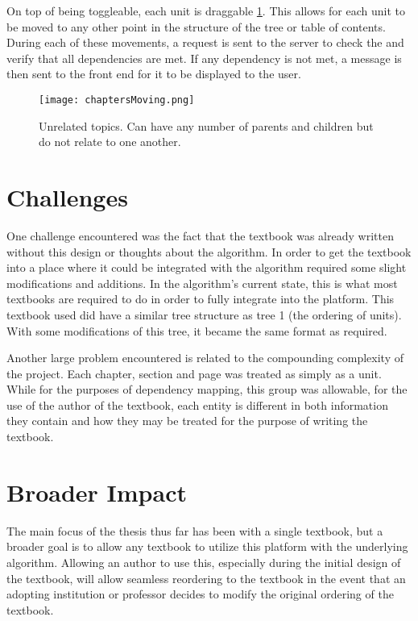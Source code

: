 \pagebreak

On top of being toggleable, each unit is draggable \ref{fig:chaptersMoving}. This allows for each unit to be moved to any other point in the structure of the tree or table of contents. During each of these movements, a request is sent to the server to check the and verify that all dependencies are met. If any dependency is not met, a message is then sent to the front end for it to be displayed to the user.

\begin{figure}[ht]
    \centering
    \texttt{[image: chaptersMoving.png]}
    \caption[Unrelated topics.]{Unrelated topics. Can have any number of parents and children but do not relate to one another.}
        
    \label{fig:chaptersMoving}
\end{figure}

\pagebreak

\section{Challenges}

One challenge encountered was the fact that the textbook was already written without this design or thoughts about the algorithm. In order to get the textbook into a place where it could be integrated with the algorithm required some slight modifications and additions. In the algorithm's current state, this is what most textbooks are required to do in order to fully integrate into the platform. This textbook used did have a similar tree structure as tree 1 (the ordering of units). With some modifications of this tree, it became the same format as required.

Another large problem encountered is related to the compounding complexity of the project. Each chapter, section and page was treated as simply as a unit. While for the purposes of dependency mapping, this group was allowable, for the use of the author of the textbook, each entity is different in both information they contain and how they may be treated for the purpose of writing the textbook.

\section{Broader Impact}

The main focus of the thesis thus far has been with a single textbook, but a broader goal is to allow any textbook to utilize this platform with the underlying algorithm. Allowing an author to use this, especially during the initial design of the textbook, will allow seamless reordering to the textbook in the event that an adopting institution or professor decides to modify the original ordering of the textbook.

